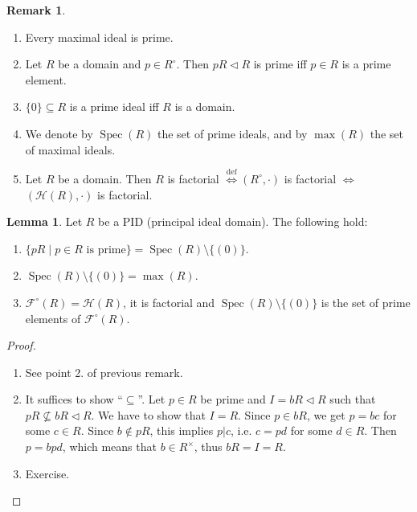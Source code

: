 \documentclass[12pt,a4paper]{report}
\theoremstyle{definition}
\newtheorem{lemma}[theorem]{Lemma}
\newtheorem{Remark}[theorem]{Remark}
\theoremstyle{num.custom-title}
\DeclareMathOperator{\sm}{\setminus}
\DeclareMathOperator{\sse}{\subseteq}
\DeclareMathOperator{\Spec}{Spec}
\newcommand{\F}{\mathcal{F}}
\renewcommand{\H}{\mathcal{H}}
\renewcommand{\iff}{\Leftrightarrow}
\begin{document}
\begin{Remark}\ 
\begin{enumerate}
\item Every maximal ideal is prime.
\item Let $R$ be a domain and $p \in R^\circ$. Then $pR \lhd R$ is prime iff $p \in R$ is a prime element.
\item $\{0\} \sse R$ is a prime ideal iff $R$ is a domain.
\item We denote by $\Spec(R)$ the set of prime ideals, and by $\max(R)$ the set of maximal ideals.
\item Let $R$ be a domain. Then $R$ is factorial $\stackrel{\text{def}}{\iff} (R^\circ,\cdot)$ is factorial $\iff$ $(\H(R),\cdot)$ is factorial.
\end{enumerate}
\end{Remark}

\begin{lemma}
Let $R$ be a PID (principal ideal domain). The following hold:
\begin{enumerate}
\item $\{pR \mid p \in R \text{ is prime}\} = \Spec(R) \sm \{(0)\}$.
\item $\Spec(R) \sm \{(0)\} = \max(R)$.
\item $\F^\circ(R) = \H(R)$, it is factorial and $\Spec(R) \sm \{(0)\}$ is the set of prime elements of $\F^\circ(R)$.
\end{enumerate}
\begin{proof}\ 
\begin{enumerate}
\item See point 2. of previous remark.
\item It suffices to show ``$\sse$''. Let $p \in R$ be prime and $I=bR \lhd R$ such that $pR \nsubseteq bR \lhd R$. We have to show that $I=R$. Since $p \in bR$, we get $p=bc$ for some $c \in R$. Since $b \not\in pR$, this implies $p|c$, i.e. $c=pd$ for some $d \in R$. Then $p=bpd$, which means that $b \in R^\times$, thus $bR=I=R$.
\item Exercise.
\end{enumerate}
\end{proof}
\end{lemma}
\end{document}
